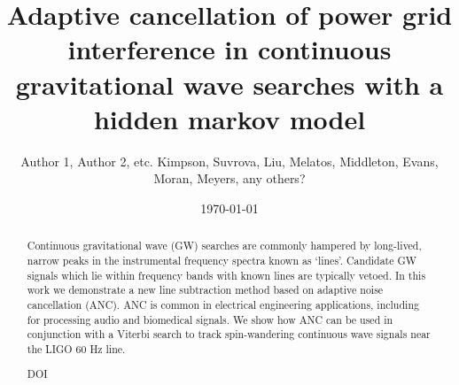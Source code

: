 \documentclass[pra,superscriptaddress,reprint,amsmath,amssymb,nofootinbib]{revtex4-2}
\begin{document}
\preprint{}

\title[test short title]{Adaptive cancellation of power grid interference in continuous gravitational wave searches with a hidden markov model}%

%

\author{Author 1, Author 2, etc. Kimpson, Suvrova, Liu, Melatos, Middleton, Evans, Moran, Meyers, any others?}
\date{\today}%


\begin{abstract}
		Continuous gravitational wave (GW) searches are commonly hampered by long-lived, narrow peaks in the instrumental frequency spectra known as `lines'. Candidate GW signals which lie within frequency bands with known lines are typically vetoed. In this work we demonstrate a new line subtraction method based on adaptive noise cancellation (ANC). ANC is common in electrical engineering applications, including for processing audio and biomedical signals. We show how ANC can be used in conjunction with a Viterbi search to track spin-wandering continuous wave signals near the LIGO 60 Hz line. 
\begin{description}
\item[DOI]
\end{description}
\end{abstract}



\maketitle	
\end{document}
